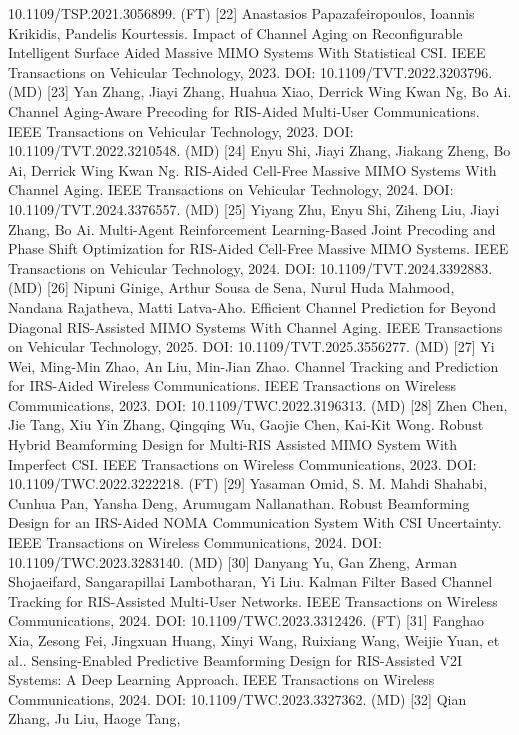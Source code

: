 \documentclass[10pt,twocolumn]{article}
\begin{document}
10.1109/TSP.2021.3056899. (FT) {[}22{]} Anastasios Papazafeiropoulos,
Ioannis Krikidis, Pandelis Kourtessis. Impact of Channel Aging on
Reconfigurable Intelligent Surface Aided Massive MIMO Systems With
Statistical CSI. IEEE Transactions on Vehicular Technology, 2023. DOI:
10.1109/TVT.2022.3203796. (MD) {[}23{]} Yan Zhang, Jiayi Zhang, Huahua
Xiao, Derrick Wing Kwan Ng, Bo Ai. Channel Aging-Aware Precoding for
RIS-Aided Multi-User Communications. IEEE Transactions on Vehicular
Technology, 2023. DOI: 10.1109/TVT.2022.3210548. (MD) {[}24{]} Enyu Shi,
Jiayi Zhang, Jiakang Zheng, Bo Ai, Derrick Wing Kwan Ng. RIS-Aided
Cell-Free Massive MIMO Systems With Channel Aging. IEEE Transactions on
Vehicular Technology, 2024. DOI: 10.1109/TVT.2024.3376557. (MD) {[}25{]}
Yiyang Zhu, Enyu Shi, Ziheng Liu, Jiayi Zhang, Bo Ai. Multi-Agent
Reinforcement Learning-Based Joint Precoding and Phase Shift
Optimization for RIS-Aided Cell-Free Massive MIMO Systems. IEEE
Transactions on Vehicular Technology, 2024. DOI:
10.1109/TVT.2024.3392883. (MD) {[}26{]} Nipuni Ginige, Arthur Sousa de
Sena, Nurul Huda Mahmood, Nandana Rajatheva, Matti Latva-Aho. Efficient
Channel Prediction for Beyond Diagonal RIS-Assisted MIMO Systems With
Channel Aging. IEEE Transactions on Vehicular Technology, 2025. DOI:
10.1109/TVT.2025.3556277. (MD) {[}27{]} Yi Wei, Ming-Min Zhao, An Liu,
Min-Jian Zhao. Channel Tracking and Prediction for IRS-Aided Wireless
Communications. IEEE Transactions on Wireless Communications, 2023. DOI:
10.1109/TWC.2022.3196313. (MD) {[}28{]} Zhen Chen, Jie Tang, Xiu Yin
Zhang, Qingqing Wu, Gaojie Chen, Kai-Kit Wong. Robust Hybrid Beamforming
Design for Multi-RIS Assisted MIMO System With Imperfect CSI. IEEE
Transactions on Wireless Communications, 2023. DOI:
10.1109/TWC.2022.3222218. (FT) {[}29{]} Yasaman Omid, S. M. Mahdi
Shahabi, Cunhua Pan, Yansha Deng, Arumugam Nallanathan. Robust
Beamforming Design for an IRS-Aided NOMA Communication System With CSI
Uncertainty. IEEE Transactions on Wireless Communications, 2024. DOI:
10.1109/TWC.2023.3283140. (MD) {[}30{]} Danyang Yu, Gan Zheng, Arman
Shojaeifard, Sangarapillai Lambotharan, Yi Liu. Kalman Filter Based
Channel Tracking for RIS-Assisted Multi-User Networks. IEEE Transactions
on Wireless Communications, 2024. DOI: 10.1109/TWC.2023.3312426. (FT)
{[}31{]} Fanghao Xia, Zesong Fei, Jingxuan Huang, Xinyi Wang, Ruixiang
Wang, Weijie Yuan, et al.. Sensing-Enabled Predictive Beamforming Design
for RIS-Assisted V2I Systems: A Deep Learning Approach. IEEE
Transactions on Wireless Communications, 2024. DOI:
10.1109/TWC.2023.3327362. (MD) {[}32{]} Qian Zhang, Ju Liu, Haoge Tang,
\end{document}

